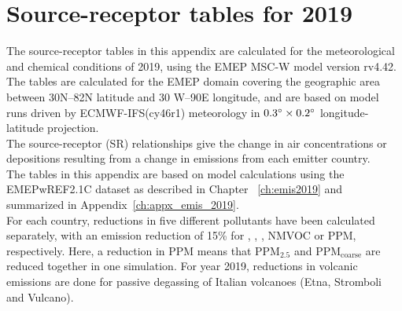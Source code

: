 \setcounter{page}{1}

\cleardoublepage
\chapter[SR tables for 2019]{Source-receptor tables for 2019}
\label{ch:appx_sr2019}



The source-receptor tables in this appendix are calculated for the
meteorological and chemical conditions of 2019, using the EMEP MSC-W model version rv4.42. The tables are calculated for the EMEP domain covering the geographic area between 30\degrees N--82\degrees N latitude and 30\degrees 
W--90\degrees E longitude, and are based on model runs driven by ECMWF-IFS(cy46r1) meteorology in $0.3^{\circ} \times 0.2^{\circ}$ longitude-latitude projection.\\

The source-receptor (SR) relationships give the change in air concentrations or depositions resulting from a
change in emissions from each emitter country.\\ 

The tables in this appendix are based on model calculations using the EMEPwREF2.1C dataset as described in Chapter ~\ref{ch:emis2019} and summarized in Appendix~\ref{ch:appx_emis_2019}.\\

For each country, reductions in five different pollutants have been
calculated separately, with an emission reduction of 15\% for \sox,
\nox, \nhiii, NMVOC or PPM, respectively. Here, a reduction in PPM
means that PPM$_{2.5}$ and PPM$_\text{coarse}$ are reduced together in one
simulation. 
For year 2019, reductions in volcanic emissions are done 
for passive \soii degassing of Italian volcanoes (Etna, Stromboli and
Vulcano). \\

